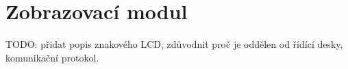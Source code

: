 \chapter{Zobrazovací modul}

TODO: přidat popis znakového LCD, zdůvodnit proč je oddělen od řídící desky, komunikační protokol.

